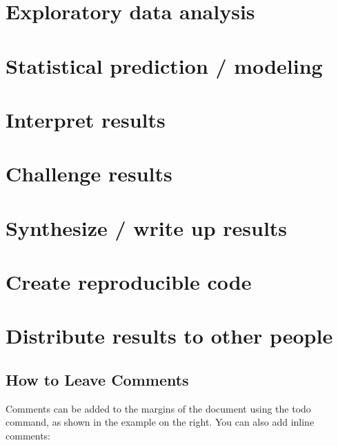 \documentclass[a4paper]{article}
\begin{document}
\section{Exploratory data analysis}

\section{Statistical prediction / modeling}

\section{Interpret results}

\section{Challenge results}

\section{Synthesize / write up results}

\section{Create reproducible code}

\section{Distribute results to other people}


\subsection{How to Leave Comments}

Comments can be added to the margins of the document using the  todo command, as shown in the example on the right. You can also add inline comments:

\end{document}
